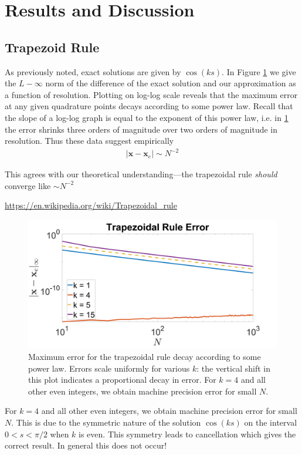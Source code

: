 \documentclass[10pt]{article}
\renewcommand{\vec}[1]{\boldsymbol{#1}}
\begin{document}
\section*{Results and Discussion}
\subsection*{Trapezoid Rule}
As previously noted, exact solutions are given by $\cos(ks)$. In Figure \ref{trap_error} we give the $L-\infty$ norm of the difference of the exact solution and our approximation as a function of resolution. Plotting on log-log scale reveals that the maximum error at any given quadrature points decays according to some power law. Recall that the slope of a log-log graph is equal to the exponent of this power law, i.e. in \ref{trap_error} the error shrinks three orders of magnitude over two orders of magnitude in resolution. Thus these data suggest empirically 
\begin{align*}
    |\vec{x} - \vec{x}_e| \sim N^{-2}
\end{align*}

\noindent This agrees with our theoretical understanding---the trapezoidal rule \textit{should} converge like $\sim N^{-2}$ 

\noindent \url{https://en.wikipedia.org/wiki/Trapezoidal_rule} 

\begin{figure}[H]
    \centering
    \includegraphics[width=4.5in]{trap_error.png}
    \caption{Maximum error for the trapezoidal rule decay according to some power law. Errors scale uniformly for various $k$: the vertical shift in this plot indicates a proportional decay in error. For $k=4$ and all other even integers, we obtain machine precision error for small $N$. }
    \label{trap_error}
\end{figure}

For $k=4$ and all other even integers, we obtain machine precision error for small $N$. This is due to the symmetric nature of the solution $\cos (ks)$ on the interval $0<s<\pi/2$ when $k$ is even. This symmetry leads to cancellation which gives the correct result. In general this does not occur!
\end{document}
